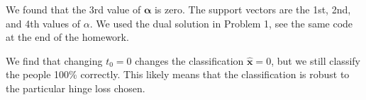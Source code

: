 \documentclass{article}
\begin{document}
\begin{homeworkProblem}
  
    We found that the 3rd value of $\bm{\alpha}$ is zero. The support vectors
    are the 1st, 2nd, and 4th values of $\alpha$. We used the dual solution in
    Problem 1, see the same code at the end of the homework.

\end{homeworkProblem}

\begin{homeworkProblem}

    We find that changing $t_0 = 0$ changes the classification $\bm{\hat{x}} =
    0$, but we still classify the people 100\% correctly. This likely means
    that the classification is robust to the particular hinge loss chosen.

\end{homeworkProblem}
\end{document}
